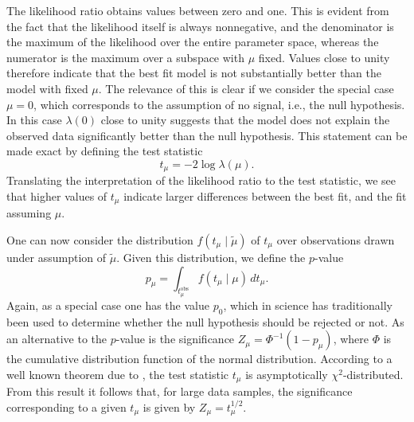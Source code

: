 \documentclass[b5paper, 10pt, twoside]{book}
\newcommand{\difd}{\,d}
\begin{document}
The likelihood ratio obtains values between zero and one. This is evident from the fact that the likelihood itself is always nonnegative, and the denominator is the maximum of the likelihood over the entire parameter space, whereas the numerator is the maximum over a subspace with $\mu$ fixed. Values close to unity therefore indicate that the best fit model is not substantially better than the model with fixed $\mu$. The relevance of this is clear if we consider the special case $\mu=0$, which corresponds to the assumption of no signal, i.e., the null hypothesis. In this case $\lambda(0)$ close to unity suggests that the model does not explain the observed data significantly better than the null hypothesis. This statement can be made exact by defining the test statistic
\begin{equation}
    t_\mu=-2\log\lambda(\mu).
\end{equation}
Translating the interpretation of the likelihood ratio to the test statistic, we see that higher values of $t_\mu$ indicate larger differences between the best fit, and the fit assuming $\mu$.

One can now consider the distribution $f(t_\mu\mid\tilde{\mu})$ of $t_\mu$ over observations drawn under assumption of $\tilde{\mu}$. Given this distribution, we define the $p$-value
\begin{equation}
    p_\mu=\int_{t_\mu^\text{obs}}f(t_\mu\mid\mu)\difd t_\mu.
\end{equation}
Again, as a special case one has the value $p_0$, which in science has traditionally been used to determine whether the null hypothesis should be rejected or not. As an alternative to the $p$-value is the significance $Z_\mu=\Phi^{-1}(1-p_\mu)$, where $\Phi$ is the cumulative distribution function of the normal distribution. According to a well known theorem due to \textcite{Wilks1938}, the test statistic $t_\mu$ is asymptotically $\chi^2$-distributed. From this result it follows that, for large data samples, the significance corresponding to a given $t_\mu$ is given by $Z_\mu=t_\mu^{1/2}$.
\end{document}
